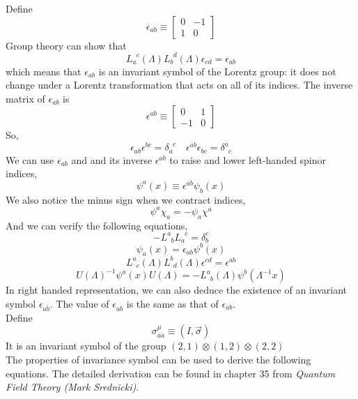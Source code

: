 \noindent
Define
\[\epsilon_{ab} \equiv \left[ \begin{matrix} 0& -1\\ 1& 0\end{matrix} \right] \]
Group theory can show that
\[L_a^{\phantom{a}c}(\Lambda) L_b^{\phantom{b}d}(\Lambda) \epsilon_{cd} = \epsilon
_{ab}\]
which means that $\epsilon_{ab}$ is an invariant symbol of the Lorentz group: it does not change under a Lorentz transformation that acts on all of its indices. The inverse matrix of $\epsilon_{ab}$ is
\[\epsilon^{ab} \equiv \left[ \begin{matrix} 0& 1\\ -1& 0\end{matrix} \right] \]
So,
\[\epsilon_{ab}\epsilon^{bc} = \delta_a^{\phantom{a}c} \quad \epsilon^{ab}\epsilon_{bc} = \delta^a_{\phantom{a}c}\]
We can use $\epsilon_{ab}$ and and its inverse $\epsilon^{ab}$ to raise and lower left-handed spinor indices, 
\[\psi^a(x) \equiv \epsilon^{ab} \psi_b(x)\]
We also notice the minus sign when we contract indices,
\[\psi^a \chi_a = -\psi_a \chi^a\]
And we can verify the following equations,
\[-L^a_{\phantom{a}b} L_a^{\phantom{a}c} = \delta^c_b \]
\[\psi_a(x) = \epsilon_{ab} \psi^b(x)\]
\[L^a_{\phantom{a}c}(\Lambda) L^b_{\phantom{b}d}(\Lambda) \epsilon^{cd} = \epsilon
^{ab}\]
\[U(\Lambda)^{-1} \psi^a(x) U(\Lambda) = -L^a_{\phantom{a}b}(\Lambda) \psi^b(\Lambda^{-1}x)\]
In right handed representation, we can also deduce the existence of an invariant symbol $\epsilon_{\dot{a}\dot{b}}$. The value of $\epsilon_{\dot{a}\dot{b}}$ is the same as that of $\epsilon_{ab}$.\\
Define
\[\sigma^{\mu}_{a\dot{a}} \equiv (I,\vec{\sigma})\]
It is an invariant symbol of the group $(2,1) \otimes (1,2) \otimes (2,2)$
\\
The properties of invariance symbol can be used to derive the following equations. The detailed derivation can be found in chapter 35 from \emph{Quantum Field Theory (Mark Srednicki)}.

